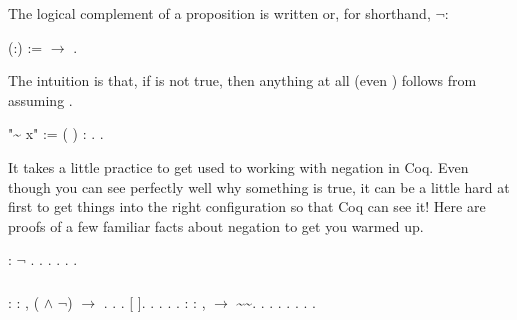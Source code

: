 \documentclass[12pt]{report}
\begin{document}
 The logical complement of a proposition  is written 
     or, for shorthand, \ensuremath{\lnot}: \begin{coqdoccode}
\coqdocemptyline
\coqdocnoindent
{}  (:) :=  \ensuremath{\rightarrow} .\coqdoceol
\coqdocemptyline
\end{coqdoccode}
The intuition is that, if  is not true, then anything at
    all (even ) follows from assuming . \begin{coqdoccode}
\coqdocemptyline
\coqdocnoindent
{} "\~{} x" := ( ) : .\coqdoceol
\coqdocemptyline
\coqdocnoindent
{} .\coqdoceol
\coqdocemptyline
\end{coqdoccode}
It takes a little practice to get used to working with
    negation in Coq.  Even though you can see perfectly well why
    something is true, it can be a little hard at first to get things
    into the right configuration so that Coq can see it!  Here are
    proofs of a few familiar facts about negation to get you warmed
    up. \begin{coqdoccode}
\coqdocemptyline
\coqdocnoindent
{}  : \coqdoceol
\coqdocindent{1.00em}
\ensuremath{\lnot} .\coqdoceol
\coqdocnoindent
{}.\coqdoceol
\coqdocindent{1.00em}
 .  .  . .\coqdoceol
\coqdocemptyline
\end{coqdoccode}
\subsubsection{ }

\begin{coqdoccode}
\coqdocnoindent
{}  : \coqdockw{\ensuremath{\forall}}   : ,\coqdoceol
\coqdocindent{1.00em}
( \ensuremath{\land} \ensuremath{\lnot}) \ensuremath{\rightarrow} .\coqdoceol
\coqdocnoindent
{}.\coqdoceol
\coqdocindent{1.00em}
   .    [ ].    .\coqdoceol
\coqdocindent{1.00em}
   .  . .\coqdoceol
\coqdocemptyline
\coqdocnoindent
{}  : \coqdockw{\ensuremath{\forall}}  : ,\coqdoceol
\coqdocindent{1.00em}
 \ensuremath{\rightarrow} \~{}\~{}.\coqdoceol
\coqdocnoindent
{}.\coqdoceol
\coqdocindent{1.00em}
  .  .  .  .  . .\coqdoceol
\coqdocemptyline
\end{coqdoccode}
\end{document}
